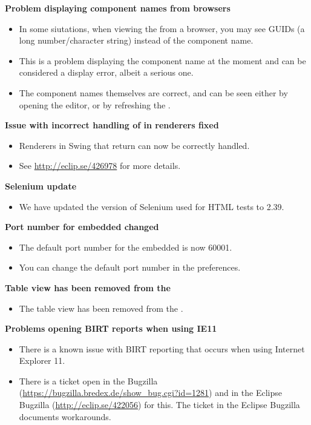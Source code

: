 \textbf{Problem displaying component names from browsers}
\begin{itemize}
\item In some siutations, when viewing the \gdcompnamesview{} from a browser, you may see GUIDs (a long number/character string) instead of the component name.
\item This is a problem displaying the component name at the moment and can be considered a display error, albeit a serious one. 
\item The component names themselves are correct, and can be seen either by opening the editor, or by refreshing the \gdproject{}.
\end{itemize}

\textbf{Issue with incorrect handling of  in renderers fixed}
\begin{itemize}
\item Renderers in Swing that return  can now be correctly handled.
\item See \url{http://eclip.se/426978} for more details. 
\end{itemize}

\textbf{Selenium update}
\begin{itemize}
\item We have updated the version of Selenium used for HTML tests to 2.39.
\end{itemize}

\textbf{Port number for embedded \gdagent{} changed}
\begin{itemize}
\item The default port number for the embedded \gdagent{} is now 60001.
\item You can change the default port number in the preferences.
\end{itemize}

\textbf{Table view has been removed from the \gdomeditor{}}
\begin{itemize}
\item The table view has been removed from the \gdomeditor{}.
\end{itemize}

\textbf{Problems opening BIRT reports when using IE11}
\begin{itemize}
\item There is a known issue with BIRT reporting that occurs when using Internet Explorer 11. 
\item There is a ticket open in the \gd{} Bugzilla (\url{https://bugzilla.bredex.de/show_bug.cgi?id=1281}) and in the Eclipse Bugzilla (\url{http://eclip.se/422056}) for this. The ticket in the Eclipse Bugzilla documents workarounds.
\end{itemize}

